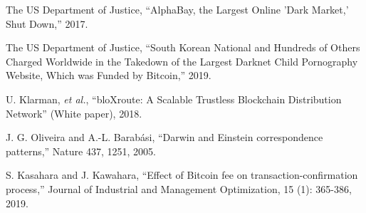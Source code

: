 \documentclass[graybox]{svmult}
\begin{document}
\begin{thebibliography}{99}
  The US Department of Justice,
  ``AlphaBay, the Largest Online 'Dark Market,' Shut Down,'' 2017.

  The US Department of Justice,
  ``South Korean National and Hundreds of Others Charged Worldwide in the Takedown 
    of the Largest Darknet Child Pornography Website, Which was Funded by Bitcoin,'' 
  2019.



  U. Klarman, \textit{et al.},
  ``bloXroute: A Scalable Trustless Blockchain Distribution Network''
  (White paper), 2018.







  J. G. Oliveira and A.-L. Barab\'asi,
  ``Darwin and Einstein correspondence patterns,'' 
  Nature 437, 1251, 2005.


  S. Kasahara and J. Kawahara,
  ``Effect of Bitcoin fee on transaction-confirmation process,''
  Journal of Industrial and Management Optimization, 15 (1): 365-386, 2019.








\end{thebibliography}
\end{document}
